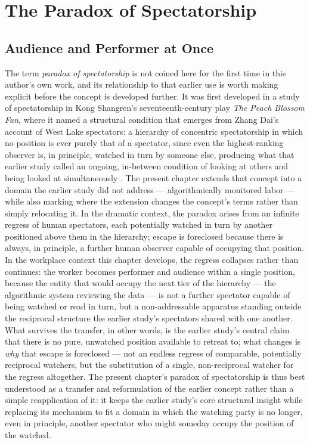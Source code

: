\documentclass[10pt]{article}
\begin{document}
\section{The Paradox of Spectatorship}

\subsection{Audience and Performer at Once}

The term \emph{paradox of spectatorship} is not coined here for the first time in this author's own work, and its relationship to that earlier use is worth making explicit before the concept is developed further. It was first developed in a study of spectatorship in Kong Shangren's seventeenth-century play \emph{The Peach Blossom Fan}, where it named a structural condition that emerges from Zhang Dai's account of West Lake spectators: a hierarchy of concentric spectatorship in which no position is ever purely that of a spectator, since even the highest-ranking observer is, in principle, watched in turn by someone else, producing what that earlier study called an ongoing, in-between condition of looking at others and being looked at simultaneously \cite{zhu2025}. The present chapter extends that concept into a domain the earlier study did not address --- algorithmically monitored labor --- while also marking where the extension changes the concept's terms rather than simply relocating it. In the dramatic context, the paradox arises from an infinite regress of human spectators, each potentially watched in turn by another positioned above them in the hierarchy; escape is foreclosed because there is always, in principle, a further human observer capable of occupying that position. In the workplace context this chapter develops, the regress collapses rather than continues: the worker becomes performer and audience within a single position, because the entity that would occupy the next tier of the hierarchy --- the algorithmic system reviewing the data --- is not a further spectator capable of being watched or read in turn, but a non-addressable apparatus standing outside the reciprocal structure the earlier study's spectators shared with one another. What survives the transfer, in other words, is the earlier study's central claim that there is no pure, unwatched position available to retreat to; what changes is \emph{why} that escape is foreclosed --- not an endless regress of comparable, potentially reciprocal watchers, but the substitution of a single, non-reciprocal watcher for the regress altogether. The present chapter's paradox of spectatorship is thus best understood as a transfer and reformulation of the earlier concept rather than a simple reapplication of it: it keeps the earlier study's core structural insight while replacing its mechanism to fit a domain in which the watching party is no longer, even in principle, another spectator who might someday occupy the position of the watched.
\end{document}

